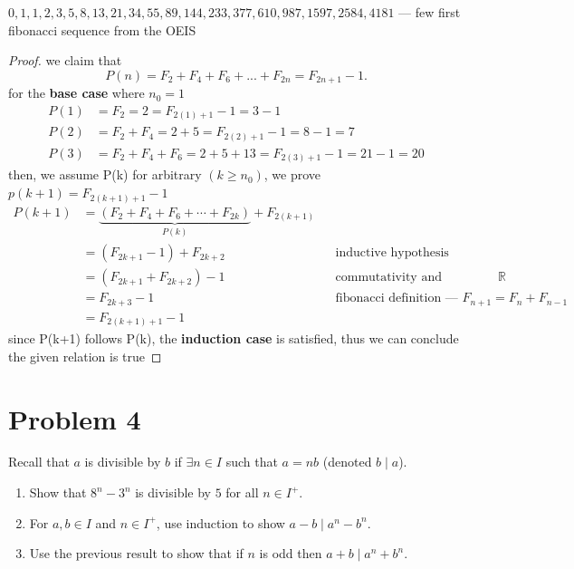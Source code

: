   \remark
  $0,1,1,2,3,5,8,13,21,34,55,89,144,233,377,610,987,1597,2584,4181$ ---
  few first fibonacci sequence from the OEIS

   \begin{proof}
    we claim that
    \[
        P(n) = F_2 + F_4 + F_6 + ... + F_{2n} = F_{2n+1} - 1.
    \]
    for the \textbf{base case} where $n_0 = 1$
    \[
    \begin{aligned}
    P(1) &= F_2 = 2 = F_{2(1)+1} - 1 = 3 - 1 \\
    P(2) &= F_2 + F_4 =  2 + 5 = F_{2(2)+1} - 1 = 8 - 1 = 7 \\
        P(3) &= F_2 + F_4 + F_6 = 2 + 5 + 13 = F_{2(3)+1} - 1 = 21 - 1
  = 20
    \end{aligned}
    \]
    then, we assume P(k) for arbitrary $(k \ge n_0)$, we prove $p(k+1)
  = F_{2(k+1)+1} - 1$
    \begin{align*}
    P(k+1) &= \underbrace{(F_2 + F_4 + F_6 + \cdots + F_{2k})}_{P(k)} +
  F_{2(k+1)}\\
        &= (F_{2k+1} - 1) + F_{2k+2} && \text{inductive hypothesis}\\
        &= (F_{2k+1} + F_{2k+2}) - 1 && \text{commutativity and
  associativity of addition in }\mathbb{R}\\
        &= F_{2k+3} - 1 && \text{fibonacci definition --- }F_{n+1} = F_n +
  F_{n-1}\\
        &= F_{2(k+1) + 1} - 1
    \end{align*}
    since P(k+1) follows P(k), the \textbf{induction case} is
  satisfied, thus we can conclude the given relation is true
   \end{proof}

  \vspace{1em}
  \hrulefill

\section*{Problem 4}
Recall that $a$ is divisible by $b$ if $\exists n \in I$ such that $a = nb$ (denoted $b \mid a$).
\begin{enumerate}[label=\arabic*.]
    \item Show that $8^n - 3^n$ is divisible by $5$ for all $n \in I^+$.
    \item For $a,b \in I$ and $n \in I^+$, use induction to show $a-b \mid a^n - b^n$.
    \item Use the previous result to show that if $n$ is odd then $a+b \mid a^n + b^n$.
\end{enumerate}
\medskip
\solution

